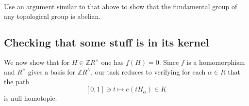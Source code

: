 \documentclass[reqno]{amsart} 
\begin{document}
\begin{exercise}
  Use an argument similar to that above to show that the fundamental group of any topological group is abelian.
\end{exercise}

\subsection{Checking that some stuff is in its kernel}
\label{sec:org9527204}
We now show that for $H \in \mathbb{Z} R^\wedge$ one has $f(H) = 0$.  Since $f$ is a homomorphism and $R^\wedge$ gives a basis for $\mathbb{Z} R^\wedge$, our task reduces to verifying for each $\alpha \in R$ that the path
\begin{equation}\label{eq:path-to-be-shown-is-nullhomotopic}
  {} [0,1] \ni t
  \mapsto e(t H_\alpha) \in K
\end{equation}
is null-homotopic.
\end{document}
